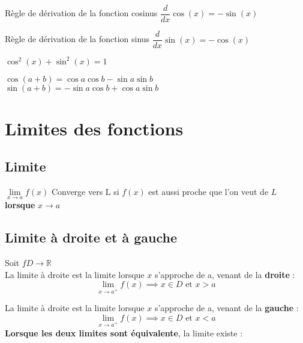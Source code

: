\documentclass{report}
\begin{document}
\begin{multicols*}{3}
\begin{Identite}{Règle de dérivation de la fonction cosinus}{}
  $\dfrac{d}{dx}\cos\left(x\right) = -\sin\left(x\right)$
\end{Identite}

\begin{Identite}{Règle de dérivation de la fonction sinus}{}
  $\dfrac{d}{dx}\sin\left(x\right) = -\cos\left(x\right)$
\end{Identite}

\begin{Identite}{}{}
    $\cos^2\left(x\right) + \sin^2\left(x\right) = 1 $ 
\end{Identite}

\begin{Identite}{}{}
    $\cos\left(a +b \right) = \cos a \cos b -\sin a \sin b$
    $\sin\left(a +b \right) = -\sin a \cos b + \cos a \sin b$
\end{Identite}

\chapter{Limites des fonctions}
\section{Limite}
\columnbreak
\begin{Definitionx*}{}{}
  $ \lim\limits_{x\to a}f(x)$ \textcolor{myb}{Converge vers L} si $f(x)$ est aussi proche que l'on veut de 
  $L$ \textbf{lorsque}   $x \to a$

\end{Definitionx*}
\vspace{-1em}

\section{Limite à droite et à gauche}
\begin{Definitionx*}{}{}
    Soit $f D\rightarrow \mathbb{R}$ \\ 
    \textcolor{myb}{La limite à droite} est la limite lorsque $x$ s'approche de a, venant de la 
    \textbf{droite}   : \\ 
    \[ \lim\limits_{x\to a^{+}} f(x) \implies  x \in D \text{ et } x > a \] 

    \textcolor{myb}{La limite à droite} est la limite lorsque $x$ s'approche de a, venant de la \textbf{gauche} : \\ 
    \[ \lim\limits_{x\to a^{+}} f(x) \implies  x \in D \text{ et } x < a \]   
  \textbf{Lorsque les deux limites sont équivalente}, \textcolor{myb}{la limite existe } :   
  

\end{Definitionx*}
\end{multicols*}
\end{document}
